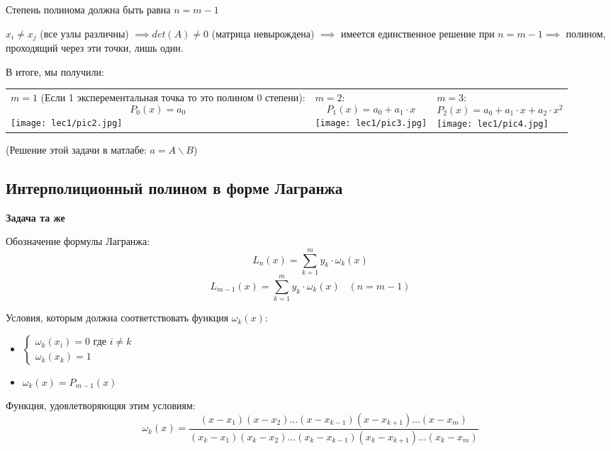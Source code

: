 \documentclass[12pt]{article}
\begin{document}
Степень полинома должна быть равна \( n = m - 1 \)

\( x_i \neq x_j \) (все узлы различны) \( \implies det(A) \neq 0 \)
(матрица невырождена) \( \implies \) имеется единственное решение при
\( n = m - 1 \implies \) полином, проходящий через эти точки, лишь один.

\vspace{10pt}

В итоге, мы получили:

\vspace{10pt}

\begin{tabularx}{\textwidth}{X|X|X}
	{
		\centering
		\( m = 1 \) (Если 1 эксперементальная точка то это полином 0 степени):
		\[ P_0(x) = a_0 \]
		\texttt{[image: lec1/pic2.jpg]}
	}
	 &
	{
			\centering
			\( m = 2 \):
			\[ P_1(x) = a_0 + a_1 \cdot x \]
			\texttt{[image: lec1/pic3.jpg]}
		}
	 &
	{
			\centering
			\( m = 3 \):
			\[ P_2(x) = a_0 + a_1 \cdot x + a_2 \cdot x^2 \]
			\texttt{[image: lec1/pic4.jpg]}
		}
\end{tabularx}

\vspace{10pt}

(Решение этой задачи в матлабе: \( a = A \backslash B \))

\subsection{Интерполиционный полином в форме Лагранжа}

\textbf{Задача та же}

Обозначение формулы Лагранжа:
\[
	L_n(x) = \sum_{k = 1}^{m} y_k \cdot \omega_k(x)
\]
\[
	L_{m-1}(x) = \sum_{k = 1}^{m} y_k \cdot \omega_k(x) \hspace{10pt} (n = m - 1)
\]

Условия, которым должна соответствовать функция \( \omega_k(x) \):
\begin{itemize}
	\centering
	\item
	      \(
	      \begin{cases}
		      \omega_k(x_i) = 0 \text{ где } i \neq k \\
		      \omega_k(x_k) = 1
	      \end{cases}
	      \)
	\item
	      \( \omega_k(x) = P_{m-1}(x) \)
\end{itemize}

Функция, удовлетворяющяя этим условиям:
\[
	\omega_k(x) = \frac
	{(x-x_1)(x-x_2)\ldots(x-x_{k-1})(x-x_{k+1})\ldots(x-x_m)}
	{(x_k-x_1)(x_k-x_2)\ldots(x_k-x_{k-1})(x_k-x_{k+1})\ldots(x_k-x_m)}
\]
\end{document}

